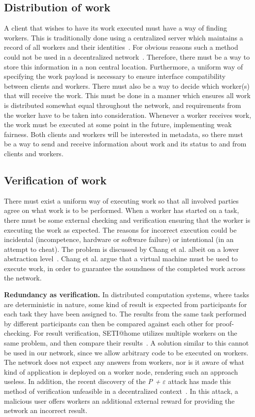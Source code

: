 \subsection{Distribution of work}
\label{sec:prob:distribution}
A client that wishes to have its work executed must have a way of finding workers. This is traditionally done using a centralized server which maintains a record of all workers and their identities~\cite{anderson:2005}\cite{sarmenta:2002}. For obvious reasons such a method could not be used in a decentralized network~\cite{baran}. Therefore, there must be a way to store this information in a non central location. Furthermore, a uniform way of specifying the work payload is necessary to ensure interface compatibility between clients and workers. There must also be a way to decide which worker(s) that will receive the work. This must be done in a manner which ensures all work is distributed somewhat equal throughout the network, and requirements from the worker have to be taken into consideration. Whenever a worker receives work, the work must be executed at some point in the future, implementing weak fairness. Both clients and workers will be interested in metadata, so there must be a way to send and receive information about work and its status to and from clients and workers.

\subsection{Verification of work}
\label{sec:prob:verification}
There must exist a uniform way of executing work so that all involved parties agree on what work is to be performed. When a worker has started on a task, there must be some external checking and verification ensuring that the worker is executing the work as expected. The reasons for incorrect execution could be incidental (incompetence, hardware or software failure) or intentional (in an attempt to cheat). The problem is discussed by Chang et al. albeit on a lower abstraction level~\cite{chang:2002}. Chang et al. argue that a virtual machine must be used to execute work, in order to guarantee the soundness of the completed work across the network.

\textbf{Redundancy as verification.} In distributed computation systems, where tasks are deterministic in nature, some kind of result is expected from participants for each task they have been assigned to. The results from the same task performed by different participants can then be compared against each other for proof-checking. For result verification, SETI@home utilizes multiple workers on the same problem, and then compare their results~\cite{korpela:2001}. A solution similar to this cannot be used in our network, since we allow arbitrary code to be executed on workers. The network does not expect any answers from workers, nor is it aware of what kind of application is deployed on a worker node, rendering such an approach useless. In addition, the recent discovery of the \emph{P +} $\varepsilon$ attack has made this method of verification unfeasible in a decentralized context~\cite{buterin:2015}. In this attack, a malicious user offers workers an additional external reward for providing the network an incorrect result.

